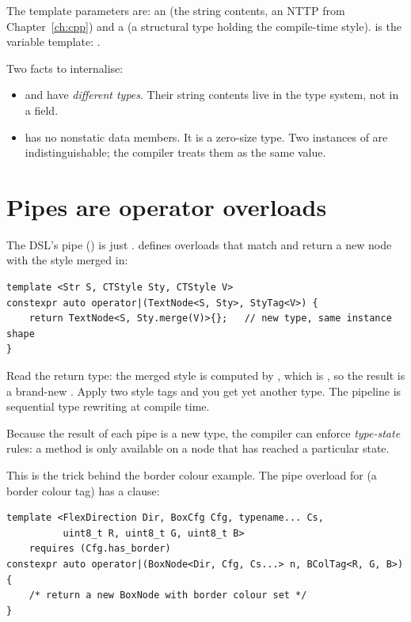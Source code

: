 The template parameters are: an  (the string contents, an
NTTP from Chapter~\ref{ch:cpp}) and a  (a structural
type holding the compile-time style).  is the
variable template: .

Two facts to internalise:
\begin{itemize}[leftmargin=*]
  \item {} and  have \emph{different types}.
    Their string contents live in the type system, not in a field.
  \item {} has no nonstatic data members. It is a zero-size
    type. Two instances of  are
    indistinguishable; the compiler treats them as the same value.
\end{itemize}

\section{Pipes are operator overloads}

The DSL's pipe (\code{|}) is just . \maya{} defines
overloads that match  and return a new node with
the style merged in:

\begin{lstlisting}
template <Str S, CTStyle Sty, CTStyle V>
constexpr auto operator|(TextNode<S, Sty>, StyTag<V>) {
    return TextNode<S, Sty.merge(V)>{};   // new type, same instance shape
}
\end{lstlisting}

Read the return type: the merged style is computed by ,
which is , so the result is a brand-new
. Apply two style tags and you get yet another
type. The pipeline is sequential type rewriting at compile time.

\begin{idea}
Because the result of each pipe is a new type, the compiler can
enforce \emph{type-state} rules: a method is only available on a node
that has reached a particular state.
\end{idea}

This is the trick behind the border colour example. The pipe overload
for  (a border colour tag) has a  clause:

\begin{lstlisting}
template <FlexDirection Dir, BoxCfg Cfg, typename... Cs,
          uint8_t R, uint8_t G, uint8_t B>
    requires (Cfg.has_border)
constexpr auto operator|(BoxNode<Dir, Cfg, Cs...> n, BColTag<R, G, B>) {
    /* return a new BoxNode with border colour set */
}
\end{lstlisting}

